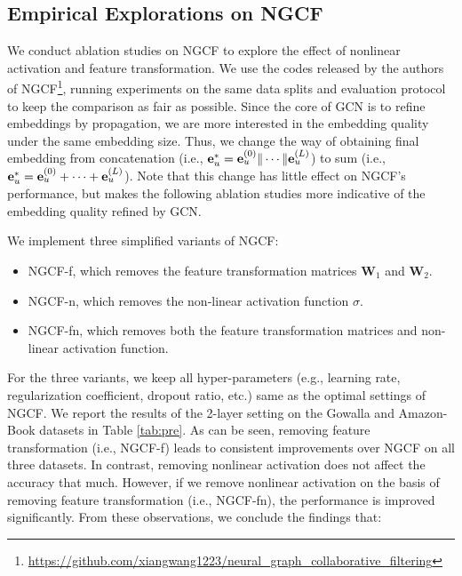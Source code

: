 \subsection{Empirical Explorations on NGCF} \label{ss:ngcf_study}
We conduct ablation studies on NGCF to explore the effect of nonlinear activation and feature transformation. We use the codes released by the authors of NGCF\footnote{\url{https://github.com/xiangwang1223/neural_graph_collaborative_filtering}}, running experiments on the same data splits and evaluation protocol to keep the comparison as fair as possible. 
Since the core of GCN is to refine embeddings by propagation, we are more interested in the embedding quality under the same embedding size. Thus, we change the way of obtaining final embedding from concatenation (i.e., $\mathbf{e}^{*}_{u}= \mathbf{e}^{(0)}_{u}\Vert\cdots\Vert\mathbf{e}^{(L)}_{u}$) to sum (i.e., $\mathbf{e}^{*}_{u}= \mathbf{e}^{(0)}_{u} + \cdots + \mathbf{e}^{(L)}_{u}$).
Note that this change has little effect on NGCF's performance, but makes the following ablation studies more indicative of the embedding quality refined by GCN. 

We implement three simplified variants of NGCF:
\begin{itemize}[leftmargin=*]
\item NGCF-f, which removes the feature transformation matrices $\textbf{W}_1$ and $\textbf{W}_2$.
\item NGCF-n, which removes the non-linear activation function $\sigma$.
\item NGCF-fn, which removes both the feature transformation matrices and non-linear activation function. 
\end{itemize}

For the three variants, we keep all hyper-parameters (e.g., learning rate, regularization coefficient, dropout ratio, etc.)  same as the optimal settings of NGCF. 
We report the results of the 2-layer setting on the Gowalla and Amazon-Book datasets in Table \ref{tab:pre}. 
As can be seen, removing feature transformation (i.e., NGCF-f) leads to consistent improvements over NGCF on all three datasets. In contrast, removing nonlinear activation does not affect the accuracy that much. However, if we remove nonlinear activation on the basis of removing feature transformation (i.e., NGCF-fn), the performance is improved significantly. From these observations, we conclude the findings that: 


